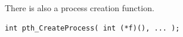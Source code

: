 \documentclass[a4paper]{article}
\begin{document}
	There is also a process creation function.
	\begin{lstlisting}[frame=none, numbers=none]
int pth_CreateProcess( int (*f)(), ... );
	\end{lstlisting}
	

	{}
	 

	
\end{document}
